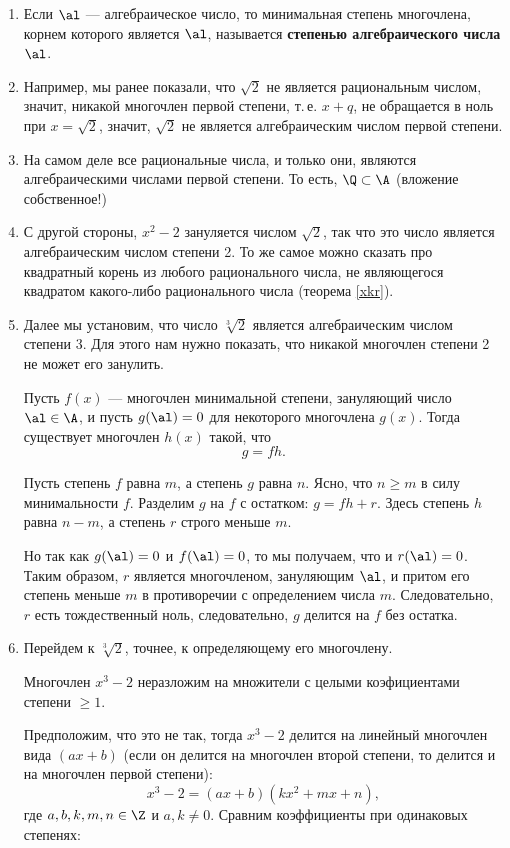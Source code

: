 \begin{enumerate}


\item Если $\al$ --- алгебраическое число, то минимальная степень многочлена, корнем которого является $\al$, называется \textbf{степенью алгебраического числа} $\al$.
\item Например, мы ранее показали, что $\sqrt 2$ не является рациональным числом, значит, никакой многочлен первой степени, т.\,е. $x+q$, не обращается в ноль при $x=\sqrt 2$, значит, $\sqrt 2$ не является алгебраическим числом первой степени. 
\item На самом деле все рациональные числа, и только они, являются алгебраическими числами первой степени. То есть, $\Q\subset\A$ (вложение собственное!)
\item С другой стороны, $x^2-2$ зануляется числом $\sqrt 2$, так что это число является алгебраическим числом степени 2. То же самое можно сказать про квадратный корень из любого рационального числа, не являющегося квадратом какого-либо рационального числа (теорема \ref{xkr}).
\item Далее мы установим, что число $\sqrt[3]{2}$ является алгебраическим числом степени 3. Для этого нам нужно показать, что никакой многочлен степени 2 не может его занулить.
\begin{lem}\label{gfh}
Пусть $f(x)$ --- многочлен минимальной степени, зануляющий число $\al\in\A$, и пусть $g(\al)=0$ для некоторого многочлена $g(x)$. Тогда существует многочлен $h(x)$ такой, что
$$
g=fh.
$$
\end{lem}
\pf
Пусть степень $f$ равна $m$, а степень $g$ равна $n$. Ясно, что $n\ge m$ в силу минимальности $f$.
Разделим $g$ на $f$ с остатком: $g=fh+r$. Здесь степень $h$ равна $n-m$, а степень $r$ строго меньше $m$.

Но так как $g(\al)=0$ и $f(\al)=0$, то мы получаем, что и $r(\al)=0$. Таким образом, $r$ является многочленом, зануляющим $\al$, и притом его степень меньше $m$ в противоречии с определением числа $m$. Следовательно, $r$ есть тождественный ноль, следовательно, $g$ делится на $f$ без остатка.
\epf
\item Перейдем к $\sqrt[3]{2}$, точнее, к определяющему его многочлену.
\begin{lem}
Многочлен $x^3-2$ неразложим на множители с целыми коэфициентами степени $\ge 1$.
\end{lem}
\pf Предположим, что это не так, тогда $x^3-2$ делится на линейный многочлен вида $(ax+b)$ (если он делится на многочлен второй степени, то делится и на многочлен первой степени):
$$
x^3-2 = (ax+b)(kx^2+mx+n),
$$
где $a,b,k,m,n\in\Z$ и $a,k\ne 0$. Сравним коэффициенты при одинаковых степенях:


\end{enumerate}
